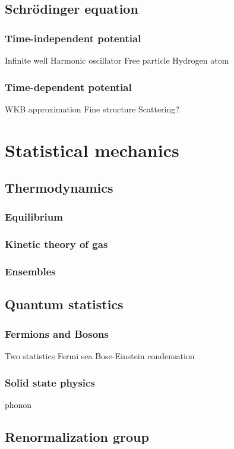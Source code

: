 \documentclass{../note}
\begin{document}
\chapter{Schr\"odinger equation}
\section{Time-independent potential}
Infinite well
Harmonic oscillator
Free particle
Hydrogen atom
\section{Time-dependent potential}
WKB approximation
Fine structure
Scattering?







\part{Statistical mechanics}
\chapter{Thermodynamics}
\section{Equilibrium}
\section{Kinetic theory of gas}
\section{Ensembles}

\chapter{Quantum statistics}
\section{Fermions and Bosons}
Two statistics
Fermi sea
Bose-Einstein condensation
\section{Solid state physics}
phonon

\chapter{Renormalization group}
\end{document}
